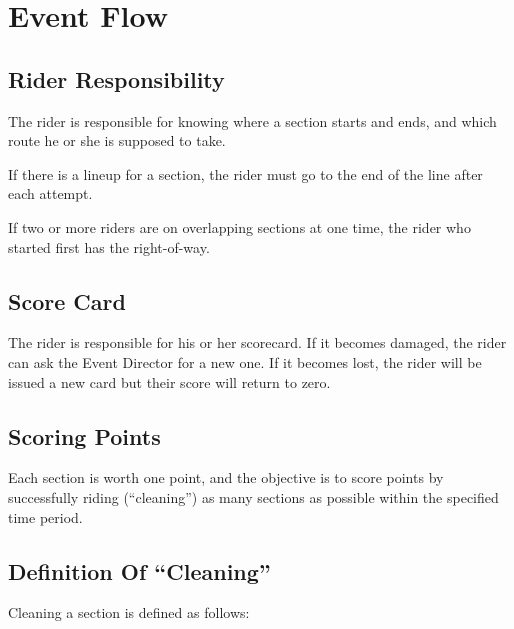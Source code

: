 \section{Event Flow}

\subsection{Rider Responsibility}

The rider is responsible for knowing where a section starts and ends, and which route he or she is supposed to take.

If there is a lineup for a section, the rider must go to the end of the line after each attempt.

If two or more riders are on overlapping sections at one time, the rider who started first has the right-of-way.


\subsection{Score Card}
The rider is responsible for his or her scorecard. 
If it becomes damaged, the rider can ask the Event Director for a new one. 
If it becomes lost, the rider will be issued a new card but their score will return to zero.

\subsection{Scoring Points}
Each section is worth one point, and the objective is to score points by successfully riding (``cleaning'') as many sections as possible within the specified time period.

\subsection{Definition Of ``Cleaning''}
Cleaning a section is defined as follows:

